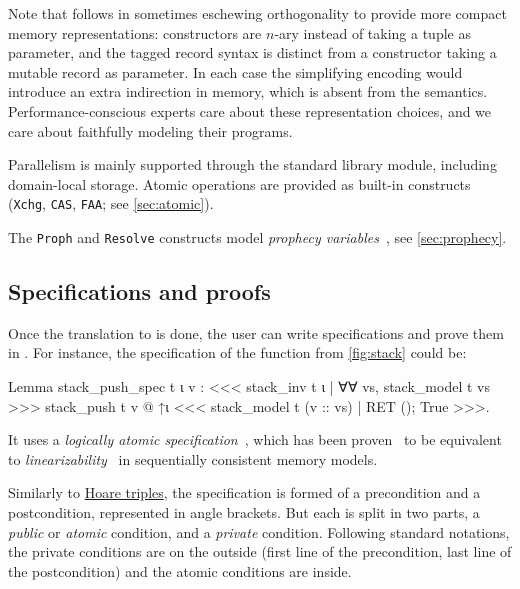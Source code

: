 Note that \ZooLang follows \OCaml in sometimes eschewing orthogonality to provide more compact memory representations: constructors are $n$-ary instead of taking a tuple as parameter, and the tagged record syntax is distinct from a constructor taking a mutable record as parameter. In each case the simplifying encoding would introduce an extra indirection in memory, which is absent from the \ZooLang semantics. Performance-conscious experts care about these representation choices, and we care about faithfully modeling their programs.

Parallelism is mainly supported through the  standard library module, including domain-local storage. Atomic operations are provided as built-in constructs (\texttt{Xchg}, \texttt{CAS}, \texttt{FAA}; see \cref{sec:atomic}).

The \texttt{Proph} and \texttt{Resolve} constructs model \emph{prophecy variables}~\citep{DBLP:journals/pacmpl/JungLPRTDJ20}, see \cref{sec:prophecy}.

\subsection{Specifications and proofs}
\label{subsec:stack-specs-and-proofs}

Once the translation to \ZooLang is done, the user can write specifications and prove them in \Iris.
For instance, the specification of the  function from \cref{fig:stack} could be:

\begin{coqcode}
Lemma stack_push_spec t ι v :
  <<< stack_inv t ι
    | ∀∀ vs, stack_model t vs >>>
    stack_push t v @ ↑ι
  <<< stack_model t (v :: vs)
    | RET (); True >>>.
\end{coqcode}

It uses a \emph{logically atomic specification}~\citep{DBLP:conf/ecoop/PintoDG14}, which has been proven~\citep{DBLP:journals/pacmpl/BirkedalDGJST21} to be equivalent to \emph{linearizability}~\citep{DBLP:journals/toplas/HerlihyW90} in sequentially consistent memory models.

Similarly to \href{https://en.wikipedia.org/wiki/Hoare_logic}{Hoare triples},
the specification is formed of a precondition and a postcondition, represented in angle brackets.
But each is split in two parts, a \emph{public} or \emph{atomic} condition, and a \emph{private} condition.
Following standard \Iris notations, the private conditions are on the outside (first line of the precondition, last line of the postcondition) and the atomic conditions are inside.

